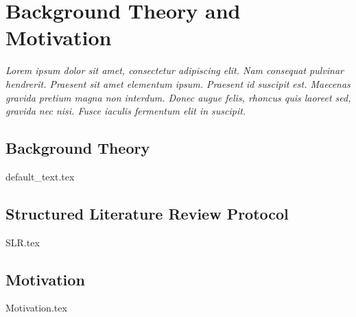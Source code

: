 \chapter{Background Theory and Motivation}\label{T-B}
\label{cha:TheoryAndBackground}

{\it Lorem ipsum dolor sit amet, consectetur adipiscing elit. Nam consequat pulvinar hendrerit. Praesent sit amet elementum ipsum. Praesent id suscipit est. Maecenas gravida pretium magna non interdum. Donec augue felis, rhoncus quis laoreet sed, gravida nec nisi. Fusce iaculis fermentum elit in suscipit.}



\section{Background Theory}
\label{sec:no1}

{default_text.tex}


\section{Structured Literature Review Protocol}
{SLR.tex}



\section{Motivation}
\label{sec:no2}
{Motivation.tex}
